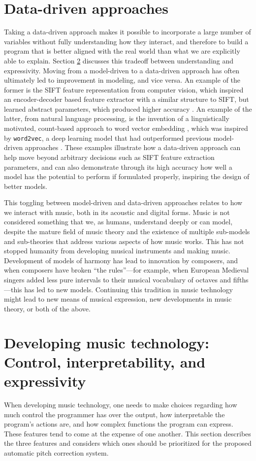 \section{Data-driven approaches}
\label{sec:pretheory}
Taking a data-driven approach makes it possible to incorporate a large number of variables without fully understanding how they interact, and therefore to build a program that is better aligned with the real world than what we are explicitly able to explain. Section \ref{sec:control-interpret-express} discusses this tradeoff between understanding and expressivity. Moving from a model-driven to a data-driven approach has often ultimately led to improvement in modeling, and vice versa. An example of the former is the SIFT feature representation from computer vision, which inspired an encoder-decoder based feature extractor with a similar structure to SIFT, but learned abstract parameters, which produced higher accuracy \cite{zheng2017sift}. An example of the latter, from natural language processing, is the invention of a linguistically motivated, count-based approach to word vector embedding \cite{pennington2014glove}, which was inspired by \texttt{word2vec}, a deep learning model that had outperformed previous model-driven approaches \cite{mikolov2013efficient}. These examples illustrate how a data-driven approach can help move beyond arbitrary decisions such as SIFT feature extraction parameters, and can also demonstrate through its high accuracy how well a model has the potential to perform if formulated properly, inspiring the design of better models.

This toggling between model-driven and data-driven approaches relates to how we interact with music, both in its acoustic and digital forms. Music is not considered something that we, as humans, understand deeply or can model, despite the mature field of music theory and the existence of multiple sub-models and sub-theories that address various aspects of how music works. This has not stopped humanity from developing musical instruments and making music. Development of models of harmony has lead to innovation by composers, and when composers have broken ``the rules''---for example, when European Medieval singers added less pure intervals to their musical vocabulary of octaves and fifths---this has led to new models. Continuing this tradition in music technology might lead to new means of musical expression, new developments in music theory, or both of the above.

\section{Developing music technology: Control, interpretability, and expressivity}
\label{sec:control-interpret-express}
When developing music technology, one needs to make choices regarding how much control the programmer has over the output, how interpretable the program's actions are, and how complex functions the program can express. These features tend to come at the expense of one another. This section describes the three features and considers which ones should be prioritized for the proposed automatic pitch correction system. 


